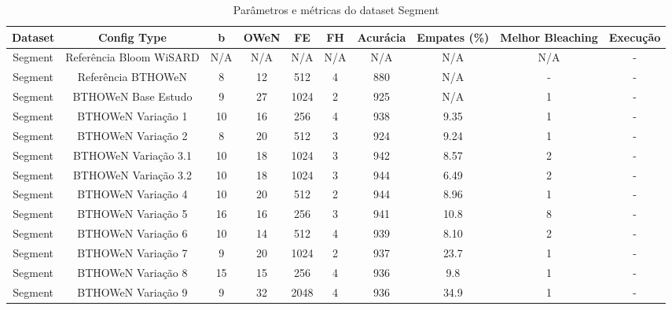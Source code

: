 \documentclass{article}
\begin{document}
\begin{longtable}{|c|c|c|c|c|c|c|c|c|c|}
\caption{Parâmetros e métricas do dataset Segment} \\
\hline
\textbf{Dataset} & \textbf{Config Type} & \textbf{b} & \textbf{OWeN} & \textbf{FE} & \textbf{FH} & \textbf{Acurácia} & \textbf{Empates (\%)} & \textbf{Melhor Bleaching} & \textbf{Execução} \\
\hline
Segment & Referência Bloom WiSARD & N/A & N/A & N/A & N/A & N/A & N/A & N/A & - \\
\hline
Segment & Referência BTHOWeN & 8 & 12 & 512 & 4 & 880 & N/A & - & - \\
\hline
Segment & BTHOWeN Base Estudo & 9 & 27 & 1024 & 2 & 925 & N/A & 1 & - \\
\hline
Segment & BTHOWeN Variação 1 & 10 & 16 & 256 & 4 & 938 & 9.35 & 1 & - \\
\hline
Segment & BTHOWeN Variação 2 & 8 & 20 & 512 & 3 & 924 & 9.24 & 1 & - \\
\hline
Segment & BTHOWeN Variação 3.1 & 10 & 18 & 1024 & 3 & 942 & 8.57 & 2 & - \\
\hline
Segment & BTHOWeN Variação 3.2 & 10 & 18 & 1024 & 3 & 944 & 6.49 & 2 & - \\
\hline
Segment & BTHOWeN Variação 4 & 10 & 20 & 512 & 2 & 944 & 8.96 & 1 & - \\
\hline
Segment & BTHOWeN Variação 5 & 16 & 16 & 256 & 3 & 941 & 10.8 & 8 & - \\
\hline
Segment & BTHOWeN Variação 6 & 10 & 14 & 512 & 4 & 939 & 8.10 & 2 & - \\
\hline
Segment & BTHOWeN Variação 7 & 9 & 20 & 1024 & 2 & 937 & 23.7 & 1 & - \\
\hline
Segment & BTHOWeN Variação 8 & 15 & 15 & 256 & 4 & 936 & 9.8 & 1 & - \\
\hline
Segment & BTHOWeN Variação 9 & 9 & 32 & 2048 & 4 & 936 & 34.9 & 1 & - \\
\hline
\end{longtable}
\end{document}
